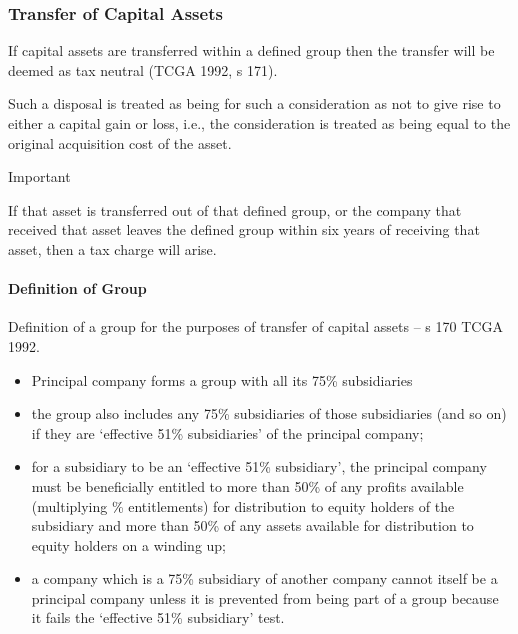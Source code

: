 \documentclass[
]{article}
\providecommand{\tightlist}{%
  \setlength{\itemsep}{0pt}\setlength{\parskip}{0pt}}
\newenvironment{env-3d391c14-39bb-45b0-8b12-18b66560aec4}
{
    \savenotes\tcolorbox[blanker,breakable,left=5pt,borderline west={2pt}{-4pt}{cyan}]
}
{
    \endtcolorbox\spewnotes
}
\begin{document}
\hypertarget{transfer-of-capital-assets}{%
\subsubsection{Transfer of Capital
Assets}\label{transfer-of-capital-assets}}

If capital assets are transferred within a defined group then the
transfer will be deemed as tax neutral (TCGA 1992, s 171).

Such a disposal is treated as being for such a consideration as not to
give rise to either a capital gain or loss, i.e., the consideration is
treated as being equal to the original acquisition cost of the asset.

\begin{env-3d391c14-39bb-45b0-8b12-18b66560aec4}

Important

If that asset is transferred out of that defined group, or the company
that received that asset leaves the defined group within six years of
receiving that asset, then a tax charge will arise.

\end{env-3d391c14-39bb-45b0-8b12-18b66560aec4}

\hypertarget{definition-of-group-1}{%
\paragraph{Definition of Group}\label{definition-of-group-1}}

Definition of a group for the purposes of transfer of capital assets --
s 170 TCGA 1992.

\begin{itemize}
\tightlist
\item
  Principal company forms a group with all its 75\% subsidiaries
\item
  the group also includes any 75\% subsidiaries of those subsidiaries
  (and so on) if they are `effective 51\% subsidiaries' of the principal
  company;
\item
  for a subsidiary to be an `effective 51\% subsidiary', the principal
  company must be beneficially entitled to more than 50\% of any profits
  available (multiplying \% entitlements) for distribution to equity
  holders of the subsidiary and more than 50\% of any assets available
  for distribution to equity holders on a winding up;
\item
  a company which is a 75\% subsidiary of another company cannot itself
  be a principal company unless it is prevented from being part of a
  group because it fails the `effective 51\% subsidiary' test.
\end{itemize}
\end{document}
